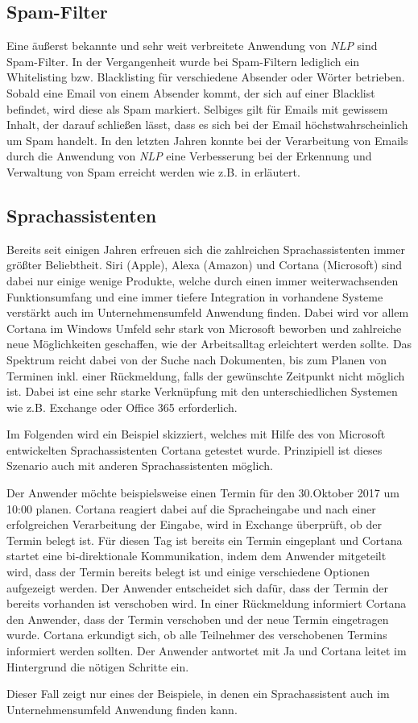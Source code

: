 \subsection{Spam-Filter}
Eine äußerst bekannte und sehr weit verbreitete Anwendung von \textit{NLP} sind Spam-Filter. In der Vergangenheit wurde bei Spam-Filtern lediglich ein Whitelisting bzw. Blacklisting für verschiedene Absender oder Wörter betrieben. Sobald eine Email von einem Absender kommt, der sich auf einer Blacklist befindet, wird diese als Spam markiert. Selbiges gilt für Emails mit gewissem Inhalt, der darauf schließen lässt, dass es sich bei der Email höchstwahrscheinlich um Spam handelt. In den letzten Jahren konnte bei der Verarbeitung von Emails durch die Anwendung von \textit{NLP} eine Verbesserung bei der Erkennung und Verwaltung von Spam erreicht werden wie z.B. in \cite{Rohit2014} erläutert. 

\subsection{Sprachassistenten}
Bereits seit einigen Jahren erfreuen sich die zahlreichen Sprachassistenten immer größter Beliebtheit. Siri (Apple), Alexa (Amazon) und Cortana (Microsoft) sind dabei nur einige wenige Produkte, welche durch einen immer weiterwachsenden Funktionsumfang und eine immer tiefere Integration in vorhandene Systeme verstärkt auch im Unternehmensumfeld Anwendung finden. Dabei wird vor allem Cortana im Windows Umfeld sehr stark von Microsoft beworben und zahlreiche neue Möglichkeiten geschaffen, wie der Arbeitsalltag erleichtert werden sollte. Das Spektrum reicht dabei von der Suche nach Dokumenten, bis zum Planen von Terminen inkl. einer Rückmeldung, falls der gewünschte Zeitpunkt nicht möglich ist. Dabei ist eine sehr starke Verknüpfung mit den unterschiedlichen Systemen wie z.B. Exchange oder Office 365 erforderlich. 

Im Folgenden wird ein Beispiel skizziert, welches mit Hilfe des von Microsoft entwickelten Sprachassistenten Cortana getestet wurde. Prinzipiell ist dieses Szenario auch mit anderen Sprachassistenten möglich.

Der Anwender möchte beispielsweise einen Termin für den 30.Oktober 2017 um 10:00 planen. Cortana reagiert dabei auf die Spracheingabe und nach einer erfolgreichen Verarbeitung der Eingabe, wird in Exchange überprüft, ob der Termin belegt ist. Für diesen Tag ist bereits ein Termin eingeplant und Cortana startet eine bi-direktionale Kommunikation, indem dem Anwender mitgeteilt wird, dass der Termin bereits belegt ist und einige verschiedene Optionen aufgezeigt werden. Der Anwender entscheidet sich dafür, dass der Termin der bereits vorhanden ist verschoben wird. In einer Rückmeldung informiert Cortana den Anwender, dass der Termin verschoben und der neue Termin eingetragen wurde. Cortana erkundigt sich, ob alle Teilnehmer des verschobenen Termins informiert werden sollten. Der Anwender antwortet mit Ja und Cortana leitet im Hintergrund die nötigen Schritte ein.

Dieser Fall zeigt nur eines der Beispiele, in denen ein Sprachassistent auch im Unternehmensumfeld Anwendung finden kann. 




